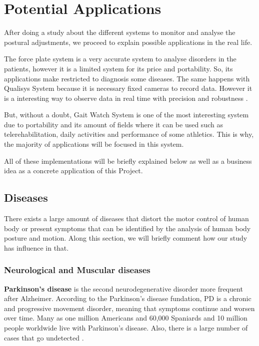 \chapter{Potential Applications}
\label{ch:Applications}

After doing a study about the different systems to monitor and analyse the postural adjustments, we proceed to explain possible applications in the real life.

The force plate system is a very accurate system to analyse disorders in the patients, however it is a limited system for its price and portability. So, its applications make restricted to diagnosis some diseases.
The same happens with Qualisys System because it is necessary fixed cameras to record data. However it is a interesting way to observe data in real time with precision and robustness .

But, without a doubt, Gait Watch System is one of the most interesting system due to portability and its amount of fields where it can be used such as telerehabilitation, daily activities and performance of some athletics. This is why, the majority of applications will be focused in this system.

All of these implementations will be briefly explained below as well as a business idea as a concrete application of this Project.

\section{Diseases}
There exists a large amount of diseases that distort the motor control of human body or present symptoms that can be identified by the analysis of human body posture and motion. Along this section,  we will briefly comment how our study has influence in that.
\vfill

\subsection{Neurological and Muscular diseases}
\textbf{Parkinson’s disease} is the second neurodegenerative disorder more frequent after Alzheimer\cite{AppPD}. According to the Parkinson’s disease fundation, PD is a chronic and progressive movement disorder, meaning that symptoms continue and worsen over time\cite{pdf}.
Many as one million Americans and 60,000 Spaniards and 10 million people worldwide live with Parkinson’s disease. Also, there is a large number of cases that go undetected \cite{A.Olivares2013}.

